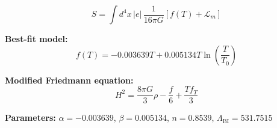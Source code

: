 
\begin{equation}
  S = \int d^4x \, |e| \, \frac{1}{16\pi G} \left[ f(T) + \mathcal{L}_m \right]
\end{equation}

\textbf{Best-fit model:}
\begin{equation}
  f(T) = -0.003639 T + 0.005134 T \ln\!\left(\frac{T}{T_0}\right)
\end{equation}

\textbf{Modified Friedmann equation:}
\begin{equation}
  H^2 = \frac{8\pi G}{3} \rho - \frac{f}{6} + \frac{T f_T}{3}
\end{equation}

\textbf{Parameters:}
$\alpha = -0.003639$, \quad
$\beta = 0.005134$, \quad
$n = 0.8539$, \quad
$\Lambda_{\text{BI}} = 531.7515$